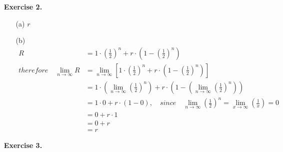 \documentclass{article}
\begin{document}
\begin{enumerate}
	\item[\textbf{Exercise 2.}]  %

	\begin{itemize}
		\item[(a)] $r$
		\item[(b)]
		\begin{equation*}
			\begin{split}
				R 
				& = 1 \cdot (\frac{1}{2})^n + r \cdot (1-(\frac{1}{2})^n) \\
				therefore \quad \lim_{n \to \infty} R
				& = \lim_{n \to \infty} [1 \cdot (\frac{1}{2})^n + r \cdot (1-(\frac{1}{2})^n)] \\
				& = 1 \cdot (\lim_{n \to \infty}(\frac{1}{2})^n) + r \cdot (1-(\lim_{n \to \infty}(\frac{1}{2})^n)) \\
				& = 1 \cdot 0 + r \cdot (1-0), \quad since \quad \lim_{n \to \infty}(\frac{1}{2})^n = \lim_{x \to \infty}(\frac{1}{x}) = 0 \\
				& = 0 + r \cdot 1 \\
				& = 0 + r \\
				& = r 
			\end{split}
		\end{equation*}
	\end{itemize}


	\item[\textbf{Exercise 3.}]   %
	

\end{enumerate}
\end{document}
